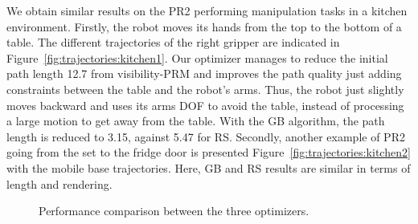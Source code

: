 \documentclass{tADR2e}
\begin{document}
We obtain similar results on the PR2 performing manipulation tasks 
in a kitchen environment.
Firstly, the robot moves its hands from the top to the bottom of a table.
The different trajectories of the right gripper are indicated in Figure~\ref{fig:trajectories:kitchen1}.
Our optimizer manages to reduce the initial path length 12.7 from visibility-PRM 
and improves the path quality 
just adding constraints between the table and the 
robot's arms. Thus, the robot just slightly moves 
backward and uses its arms DOF to avoid the table, instead of 
processing a large motion to get away from the table. With the GB algorithm, the path length is 
reduced to 3.15, against 5.47 for RS.
Secondly, another example of PR2 going from the set to the fridge 
door is presented Figure~\ref{fig:trajectories:kitchen2} with the mobile base
trajectories. Here, GB and RS results are similar in terms of length and rendering.

\vspace{0.4cm}

\begin{figure}[H]
	\centering
  \caption{Performance comparison between the three optimizers.}
  \label{fig:remainingLength}
\end{figure}
\end{document}
